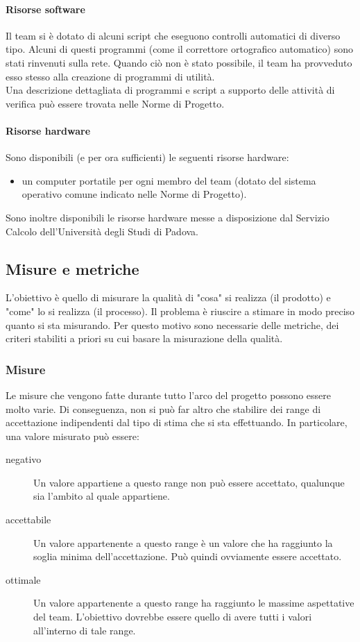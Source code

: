 				\paragraph{Risorse software}
					Il team si è dotato di alcuni script che eseguono controlli automatici di diverso tipo. Alcuni di questi programmi (come il 
					correttore ortografico automatico) sono stati rinvenuti sulla rete. Quando ciò non è stato possibile, il team ha provveduto esso 
					stesso alla creazione di programmi di utilità.\\
					Una descrizione dettagliata di programmi e script a supporto delle attività di verifica può essere trovata nelle Norme di Progetto.
				\paragraph{Risorse hardware}
					Sono disponibili (e per ora sufficienti) le seguenti risorse hardware:
					\begin{itemize}
						\item un computer portatile per ogni membro del team (dotato del sistema operativo comune indicato nelle Norme di Progetto).
					\end{itemize}
					Sono inoltre disponibili le risorse hardware messe a disposizione dal Servizio Calcolo dell'Università degli Studi di Padova.
		\subsection{Misure e metriche}
			L'obiettivo è quello di misurare la qualità di "cosa" si realizza (il prodotto) e "come" lo si realizza (il processo). Il problema è 
			riuscire a stimare in modo preciso quanto si sta misurando. Per questo motivo sono necessarie delle metriche, dei criteri stabiliti a 
			priori su cui basare la misurazione della qualità.
			\subsubsection{Misure}
				Le misure che vengono fatte durante tutto l'arco del progetto possono essere molto varie. Di conseguenza, non si può far altro che 
				stabilire dei range di accettazione indipendenti dal tipo di stima che si sta effettuando. In particolare, una valore misurato può 
				essere:
				\begin{description}
					\item[negativo] Un valore appartiene a questo range non può essere accettato, qualunque sia l'ambito al quale appartiene.
					\item[accettabile] Un valore appartenente a questo range è un valore che ha raggiunto la soglia minima dell'accettazione. Può 
					quindi ovviamente essere accettato.
					\item[ottimale] Un valore appartenente a questo range ha raggiunto le massime aspettative del team. L'obiettivo dovrebbe essere 
					quello di avere tutti i valori all'interno di tale range.
				\end{description}
